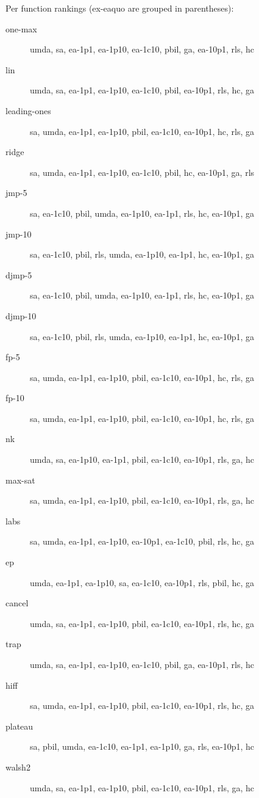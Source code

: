 Per function rankings (ex-eaquo are grouped in parentheses):
\begin{description}
\item[one-max]
umda, sa, ea-1p1, ea-1p10, ea-1c10, pbil, ga, ea-10p1, rls, hc

\item[lin]
umda, sa, ea-1p1, ea-1p10, ea-1c10, pbil, ea-10p1, rls, hc, ga

\item[leading-ones]
sa, umda, ea-1p1, ea-1p10, pbil, ea-1c10, ea-10p1, hc, rls, ga

\item[ridge]
sa, umda, ea-1p1, ea-1p10, ea-1c10, pbil, hc, ea-10p1, ga, rls

\item[jmp-5]
sa, ea-1c10, pbil, umda, ea-1p10, ea-1p1, rls, hc, ea-10p1, ga

\item[jmp-10]
sa, ea-1c10, pbil, rls, umda, ea-1p10, ea-1p1, hc, ea-10p1, ga

\item[djmp-5]
sa, ea-1c10, pbil, umda, ea-1p10, ea-1p1, rls, hc, ea-10p1, ga

\item[djmp-10]
sa, ea-1c10, pbil, rls, umda, ea-1p10, ea-1p1, hc, ea-10p1, ga

\item[fp-5]
sa, umda, ea-1p1, ea-1p10, pbil, ea-1c10, ea-10p1, hc, rls, ga

\item[fp-10]
sa, umda, ea-1p1, ea-1p10, pbil, ea-1c10, ea-10p1, hc, rls, ga

\item[nk]
umda, sa, ea-1p10, ea-1p1, pbil, ea-1c10, ea-10p1, rls, ga, hc

\item[max-sat]
sa, umda, ea-1p1, ea-1p10, pbil, ea-1c10, ea-10p1, rls, ga, hc

\item[labs]
sa, umda, ea-1p1, ea-1p10, ea-10p1, ea-1c10, pbil, rls, hc, ga

\item[ep]
umda, ea-1p1, ea-1p10, sa, ea-1c10, ea-10p1, rls, pbil, hc, ga

\item[cancel]
umda, sa, ea-1p1, ea-1p10, pbil, ea-1c10, ea-10p1, rls, hc, ga

\item[trap]
umda, sa, ea-1p1, ea-1p10, ea-1c10, pbil, ga, ea-10p1, rls, hc

\item[hiff]
sa, umda, ea-1p1, ea-1p10, pbil, ea-1c10, ea-10p1, rls, hc, ga

\item[plateau]
sa, pbil, umda, ea-1c10, ea-1p1, ea-1p10, ga, rls, ea-10p1, hc

\item[walsh2]
umda, sa, ea-1p1, ea-1p10, pbil, ea-1c10, ea-10p1, rls, ga, hc

\end{description}

